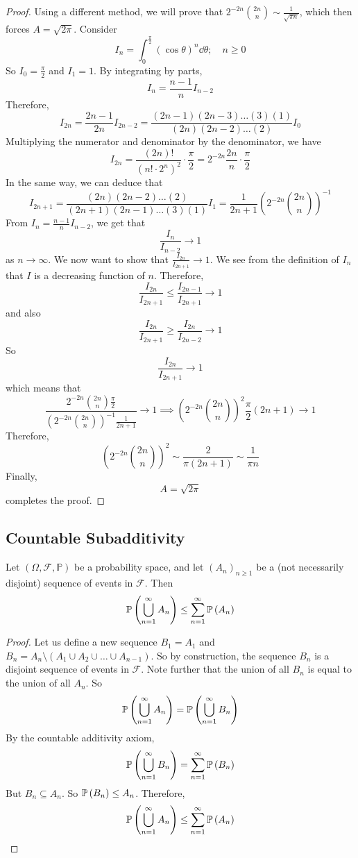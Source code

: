 \begin{proof}
	Using a different method, we will prove that \(2^{-2n} \binom{2n}{n} \sim \frac{1}{\sqrt{\pi n}}\), which then forces \(A = \sqrt{2\pi}\).
	Consider
	\[
		I_n = \int_0^{\frac{\pi}{2}} (\cos \theta)^n \dd{\theta};\quad n \geq 0
	\]
	So \(I_0 = \frac{\pi}{2}\) and \(I_1 = 1\).
	By integrating by parts,
	\[
		I_n = \frac{n-1}{n}I_{n-2}
	\]
	Therefore,
	\[
		I_{2n} = \frac{2n-1}{2n}I_{2n-2} = \frac{(2n-1)(2n-3)\dots(3)(1)}{(2n)(2n-2)\dots(2)}I_0
	\]
	Multiplying the numerator and denominator by the denominator, we have
	\[
		I_{2n} = \frac{(2n)!}{(n!
			\cdot 2^n)^2} \cdot \frac{\pi}{2} = 2^{-2n} \frac{2n}{n} \cdot \frac{\pi}{2}
	\]
	In the same way, we can deduce that
	\[
		I_{2n+1} = \frac{(2n)(2n-2)\dots(2)}{(2n+1)(2n-1)\dots(3)(1)}I_1 = \frac{1}{2n+1} \left( 2^{-2n} \binom{2n}{n} \right)^{-1}
	\]
	From \(I_n = \frac{n-1}{n}I_{n-2}\), we get that
	\[
		\frac{I_n}{I_{n-2}} \to 1
	\]
	as \(n \to \infty\).
	We now want to show that \(\frac{I_{2n}}{I_{2n+1}} \to 1\).
	We see from the definition of \(I_n\) that \(I\) is a decreasing function of \(n\).
	Therefore,
	\[
		\frac{I_{2n}}{I_{2n+1}} \leq \frac{I_{2n-1}}{I_{2n+1}} \to 1
	\]
	and also
	\[
		\frac{I_{2n}}{I_{2n+1}} \geq \frac{I_{2n}}{I_{2n-2}} \to 1
	\]
	So
	\[
		\frac{I_{2n}}{I_{2n+1}} \to 1
	\]
	which means that
	\[
		\frac{2^{-2n} \binom{2n}{n} \frac{\pi}{2}}{\left( 2^{-2n} \binom{2n}{n} \right)^{-1} \frac{1}{2n+1}} \to 1 \implies \left( 2^{-2n} \binom{2n}{n} \right)^2 \frac{\pi}{2} (2n+1) \to 1
	\]
	Therefore,
	\[
		\left( 2^{-2n} \binom{2n}{n} \right)^2 \sim \frac{2}{\pi (2n+1)} \sim \frac{1}{\pi n}
	\]
	Finally,
	\[
		A = \sqrt{2 \pi}
	\]
	completes the proof.
\end{proof}

\subsection{Countable Subadditivity}
Let \((\Omega, \mathcal F, \mathbb P)\) be a probability space, and let \((A_n)_{n \geq 1}\) be a (not necessarily disjoint) sequence of events in \(\mathcal F\).
Then
\[
	\mathbb{P}\left({\bigcup_{n=1}^\infty A_n}\right) \leq \sum_{n=1}^\infty \mathbb{P}\left({A_n}\right)
\]
\begin{proof}
	Let us define a new sequence \(B_1 = A_1\) and \(B_n = A_n \setminus (A_1 \cup A_2 \cup \dots \cup A_{n-1})\).
	So by construction, the sequence \(B_n\) is a disjoint sequence of events in \(\mathcal F\).
	Note further that the union of all \(B_n\) is equal to the union of all \(A_n\).
	So
	\[
		\mathbb{P}\left({\bigcup_{n=1}^\infty A_n}\right) = \mathbb{P}\left({\bigcup_{n=1}^\infty B_n}\right)
	\]
	By the countable additivity axiom,
	\[
		\mathbb{P}\left({\bigcup_{n=1}^\infty B_n}\right) = \sum_{n=1}^\infty \mathbb{P}\left({B_n}\right)
	\]
	But \(B_n \subseteq A_n\).
	So \(\mathbb{P}\left({B_n}\right) \leq A_n\).
	Therefore,
	\[
		\mathbb{P}\left({\bigcup_{n=1}^\infty A_n}\right) \leq \sum_{n=1}^\infty \mathbb{P}\left({A_n}\right)
	\]
\end{proof}
